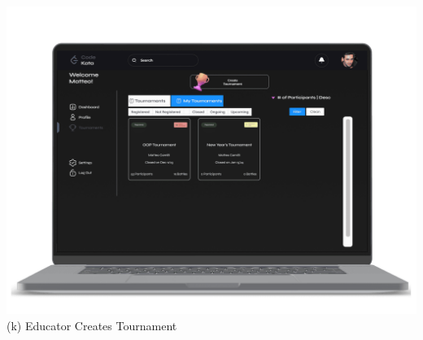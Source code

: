 \begin{center}
\includegraphics[scale=0.13]{Images/ui-ux/educator_create_tournament_4.png}
        (k) Educator Creates Tournament
\end{center}
\newpage
